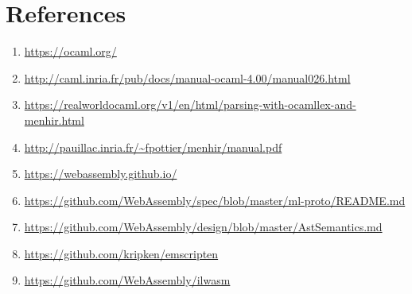 \documentclass{article}
\begin{document}
\section{References}
\begin{enumerate}
  \item \url{https://ocaml.org/}
  \item \url{http://caml.inria.fr/pub/docs/manual-ocaml-4.00/manual026.html}
  \item \url{https://realworldocaml.org/v1/en/html/parsing-with-ocamllex-and-menhir.html}
  \item \url{http://pauillac.inria.fr/~fpottier/menhir/manual.pdf}
  \item \url{https://webassembly.github.io/}
  \item \url{https://github.com/WebAssembly/spec/blob/master/ml-proto/README.md}
  \item \url{https://github.com/WebAssembly/design/blob/master/AstSemantics.md}
  \item \url{https://github.com/kripken/emscripten}
  \item \url{https://github.com/WebAssembly/ilwasm}
\end{enumerate}
\end{document}
